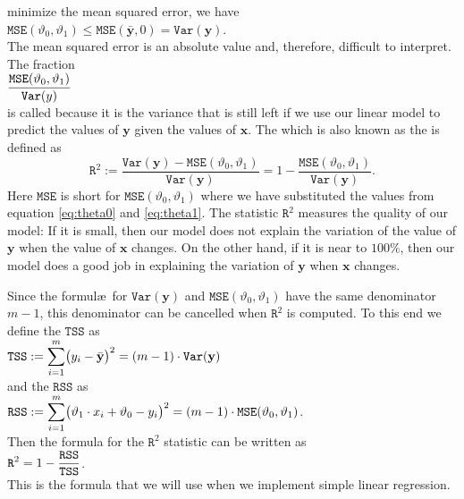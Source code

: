 minimize the mean squared error, we have
\\[0.2cm]
\hspace*{1.3cm}
$\mathtt{MSE}(\vartheta_0, \vartheta_1) \leq \mathtt{MSE}(\bar{\mathbf{y}}, 0) = \mathtt{Var}(\mathbf{y})$.
\\[0.2cm]
The mean squared error is an absolute value and, therefore, difficult to interpret.  The fraction
\\[0.2cm]
\hspace*{1.3cm}
$\displaystyle \frac{\mathtt{MSE}(\vartheta_0, \vartheta_1)}{\mathtt{Var}(y)}$
\\[0.2cm]
is called  because it is the variance that is still
left if we use our linear model to predict the values of $\mathbf{y}$ given the values of $\mathbf{x}$.  The
 which is also known as the  is defined as 
\begin{equation}
  \label{eq:Rsquare}
  \mathtt{R}^2 := \frac{\mathtt{Var}(\mathbf{y}) - \mathtt{MSE}(\vartheta_0, \vartheta_1)}{\mathtt{Var}(\mathbf{y})} 
                = 1 - \frac{\mathtt{MSE}(\vartheta_0, \vartheta_1)}{\mathtt{Var}(\mathbf{y})}.
\end{equation}
Here $\mathtt{MSE}$ is short for $\mathtt{MSE}(\vartheta_0, \vartheta_1)$ where we have substituted the values
from equation \ref{eq:theta0} and \ref{eq:theta1}.  The statistic $\mathtt{R}^2$ measures the quality of our
model: If it is small, then our model does not explain the variation of the value of $\mathbf{y}$ when the value of $\mathbf{x}$
changes.  On the other hand, if it is near to $100\%$, then our model does a good job in explaining the 
variation of $\mathbf{y}$ when $\mathbf{x}$ changes.

Since the formul\ae\ for $\mathtt{Var}(\mathbf{y})$ and $\mathtt{MSE}(\vartheta_0, \vartheta_1)$ have the same
denominator $m-1$, this denominator can be cancelled when $\mathtt{R}^2$ is computed.  To this
end we define the  $\mathtt{TSS}$ as
\\[0.2cm]
\hspace*{1.3cm}
$\displaystyle\mathtt{TSS} := \sum\limits_{i=1}^m \bigl(y_i - \bar{\mathbf{y}}\bigr)^2 = (m-1) \cdot \mathtt{Var}(\mathbf{y})$
\\[0.2cm]
and the  $\mathtt{RSS}$ as
\\[0.2cm]
\hspace*{1.3cm}
$\displaystyle\mathtt{RSS} := \sum\limits_{i=1}^m \bigl(\vartheta_1 \cdot x_i + \vartheta_0 - y_i\bigr)^2
                  = (m-1) \cdot \mathtt{MSE}(\vartheta_0, \vartheta_1)
$.
\\[0.2cm]
Then the formula for the $\mathtt{R}^2$ statistic can be written as
\\[0.2cm]
\hspace*{1.3cm}
$\displaystyle \mathtt{R}^2 = 1 - \frac{\mathtt{RSS}}{\mathtt{TSS}}$.
\\[0.2cm]
This is the formula that we will use when we implement simple linear regression.

